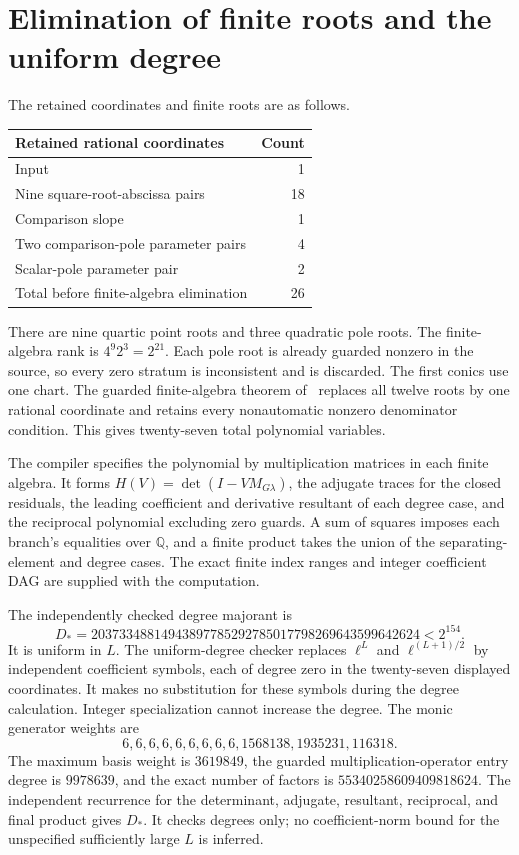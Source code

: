 \documentclass[11pt,a4paper]{article}
\newcommand{\Q}{\mathbb Q}\newcommand{\Z}{\mathbb Z}
\begin{document}
\section{Elimination of finite roots and the uniform degree}

The retained coordinates and finite roots are as follows.
\begin{center}
\begin{tabular}{lr}
\toprule
Retained rational coordinates & Count\\
\midrule
Input & 1\\
Nine square-root-abscissa pairs & 18\\
Comparison slope & 1\\
Two comparison-pole parameter pairs & 4\\
Scalar-pole parameter pair & 2\\
\midrule
Total before finite-algebra elimination & 26\\
\bottomrule
\end{tabular}
\end{center}
There are nine quartic point roots and three quadratic pole roots.
The finite-algebra rank is $4^9 2^3=2^{21}$. Each pole root is
already guarded nonzero in the source, so every zero stratum is
inconsistent and is discarded. The first conics use one chart.
The guarded finite-algebra theorem of~\cite{Baseline} replaces
all twelve roots by one rational coordinate and retains every
nonautomatic nonzero denominator condition. This gives twenty-seven
total polynomial variables.

The compiler specifies the polynomial by multiplication matrices
in each finite algebra. It forms
$H(V)=\det(I-VM_{G\lambda})$, the adjugate traces for the
closed residuals, the leading coefficient and derivative
resultant of each degree case, and the reciprocal polynomial
excluding zero guards. A sum of squares imposes each branch's
equalities over $\Q$, and a finite product takes the union of
the separating-element and degree cases. The exact finite index ranges and integer coefficient
DAG are supplied with the computation.

The independently checked degree majorant is
\[
 D_*=20373348814943897785292785017798269643599642624
       <2^{154}.
\]
It is uniform in $L$. The uniform-degree checker replaces
$\ell^L$ and $\ell^{(L+1)/2}$ by independent coefficient
symbols, each of degree zero in the twenty-seven displayed
coordinates. It makes no substitution for these symbols during
the degree calculation. Integer specialization cannot increase
the degree. The monic generator weights are
\[
 6,6,6,6,6,6,6,6,6,1568138,1935231,116318.
\]
The maximum basis weight is $3619849$, the guarded
multiplication-operator entry degree is $9978639$, and
the exact number of factors is $55340258609409818624$.
The independent recurrence for the determinant, adjugate,
resultant, reciprocal, and final product gives $D_*$.
It checks degrees only; no coefficient-norm bound for the
unspecified sufficiently large $L$ is inferred.
\end{document}
